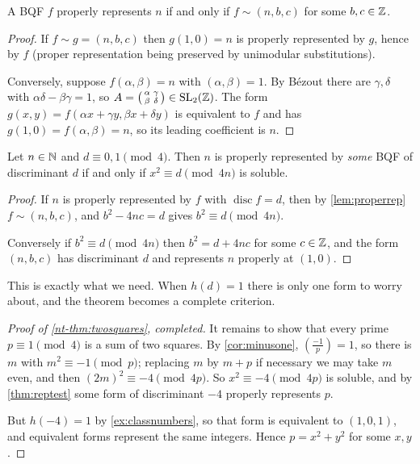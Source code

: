 \documentclass[a4paper]{scrartcl}
\DeclareMathOperator{\disc}{disc}
\begin{document}
\begin{lemma}\label{lem:properrep}
	A BQF $f$ properly represents $n$ if and only if $f \sim (n, b, c)$ for some $b, c \in \mathbb{Z}$.
\end{lemma}
\begin{proof}
	If $f \sim g = (n, b, c)$ then $g(1, 0) = n$ is properly represented by $g$, hence by $f$ (proper representation being preserved by unimodular substitutions).

	Conversely, suppose $f(\alpha, \beta) = n$ with $(\alpha, \beta) = 1$. By Bézout there are $\gamma, \delta$ with $\alpha\delta - \beta\gamma = 1$, so $A = \left(\begin{smallmatrix} \alpha & \gamma \\ \beta & \delta \end{smallmatrix}\right) \in \operatorname{SL}_2(\mathbb{Z})$. The form $g(x,y) = f(\alpha x + \gamma y, \beta x + \delta y)$ is equivalent to $f$ and has $g(1,0) = f(\alpha,\beta) = n$, so its leading coefficient is $n$.
\end{proof}

\begin{theorem}\label{thm:reptest}
	Let $n \in \mathbb{N}$ and $d \equiv 0, 1 \pmod 4$. Then $n$ is properly represented by \emph{some} BQF of discriminant $d$ if and only if $x^2 \equiv d \pmod{4n}$ is soluble.
\end{theorem}
\begin{proof}
	If $n$ is properly represented by $f$ with $\disc f = d$, then by \autoref{lem:properrep} $f \sim (n, b, c)$, and $b^2 - 4nc = d$ gives $b^2 \equiv d \pmod {4n}$.

	Conversely if $b^2 \equiv d \pmod{4n}$ then $b^2 = d + 4nc$ for some $c \in \mathbb{Z}$, and the form $(n, b, c)$ has discriminant $d$ and represents $n$ properly at $(1,0)$.
\end{proof}

This is exactly what we need. When $h(d) = 1$ there is only one form to worry about, and the theorem becomes a complete criterion.

\begin{proof}[Proof of \autoref{nt-thm:twosquares}, completed]
	It remains to show that every prime $p \equiv 1 \pmod 4$ is a sum of two squares. By \autoref{cor:minusone}, $\left( \frac{-1}p \right) = 1$, so there is $m$ with $m^2 \equiv -1 \pmod p$; replacing $m$ by $m + p$ if necessary we may take $m$ even, and then $(2m)^2 \equiv -4 \pmod{4p}$. So $x^2 \equiv -4 \pmod{4p}$ is soluble, and by \autoref{thm:reptest} some form of discriminant $-4$ properly represents $p$.

	But $h(-4) = 1$ by \autoref{ex:classnumbers}, so that form is equivalent to $(1,0,1)$, and equivalent forms represent the same integers. Hence $p = x^2 + y^2$ for some $x, y$.
\end{proof}
\end{document}
